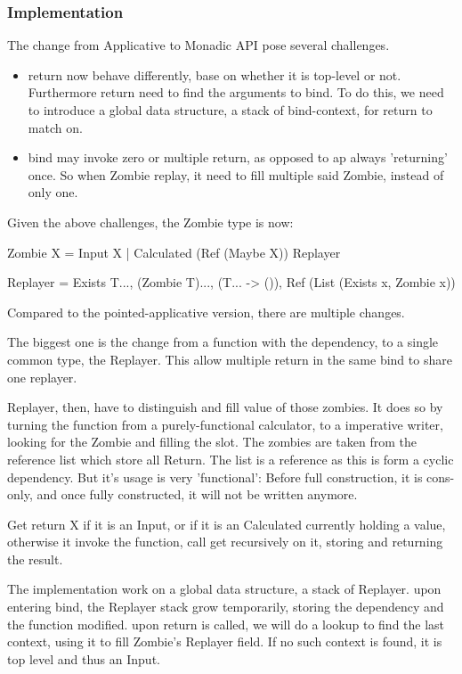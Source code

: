 \subsubsection{Implementation}
The change from Applicative to Monadic API pose several challenges.

\begin{itemize}
	\item return now behave differently, base on whether it is top-level or not. Furthermore return need to find the arguments to bind. To do this, we need to introduce a global data structure, a stack of bind-context, for return to match on.
	\item bind may invoke zero or multiple return, as opposed to ap always 'returning' once. So when Zombie replay, it need to fill multiple said Zombie, instead of only one.
\end{itemize}

Given the above challenges, the Zombie type is now:

Zombie X = Input X | Calculated (Ref (Maybe X)) Replayer

Replayer = Exists T..., (Zombie T)..., (T... -> ()), Ref (List (Exists x, Zombie x))

Compared to the pointed-applicative version, there are multiple changes.

The biggest one is the change from a function with the dependency, to a single common type, the Replayer. This allow multiple return in the same bind to share one replayer.

Replayer, then, have to distinguish and fill value of those zombies. It does so by turning the function from a purely-functional calculator, to a imperative writer, looking for the Zombie and filling the slot. The zombies are taken from the reference list which store all Return. The list is a reference as this is form a cyclic dependency. But it's usage is very 'functional': Before full construction, it is cons-only, and once fully constructed, it will not be written anymore.

Get return X if it is an Input, or if it is an Calculated currently holding a value, otherwise it invoke the function, call get recursively on it, storing and returning the result.

The implementation work on a global data structure, a stack of Replayer. upon entering bind, the Replayer stack grow temporarily, storing the dependency and the function modified. upon return is called, we will do a lookup to find the last context, using it to fill Zombie's Replayer field. If no such context is found, it is top level and thus an Input.

